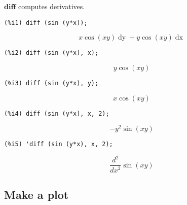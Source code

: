 \documentclass[12pt,leqno]{article}
\begin{document}
$\mathbf{diff}$ computes derivatives.
\begin{verbatim}
(%i1) diff (sin (y*x));
\end{verbatim}
\begin{dmath}[number={\(\mathop{\mathrm{\%o}_{1}}\)}]
x \cos \left(x y\right) \mathop{dy}+y \cos \left(x y\right) \mathop{dx}
\end{dmath}
\begin{verbatim}
(%i2) diff (sin (y*x), x);
\end{verbatim}
\begin{dmath}[number={\(\mathop{\mathrm{\%o}_{2}}\)}]
y \cos \left(x y\right)
\end{dmath}
\begin{verbatim}
(%i3) diff (sin (y*x), y);
\end{verbatim}
\begin{dmath}[number={\(\mathop{\mathrm{\%o}_{3}}\)}]
x \cos \left(x y\right)
\end{dmath}
\begin{verbatim}
(%i4) diff (sin (y*x), x, 2);
\end{verbatim}
\begin{dmath}[number={\(\mathop{\mathrm{\%o}_{4}}\)}]
-{y}^{2} \sin \left(x y\right)
\end{dmath}
\begin{verbatim}
(%i5) 'diff (sin (y*x), x, 2);
\end{verbatim}
\begin{dmath}[number={\(\mathop{\mathrm{\%o}_{5}}\)}]
\frac{{d}^{2}}{d {x}^{2}}\sin \left(x y\right)
\end{dmath}


\subsection{Make a plot}
\end{document}
